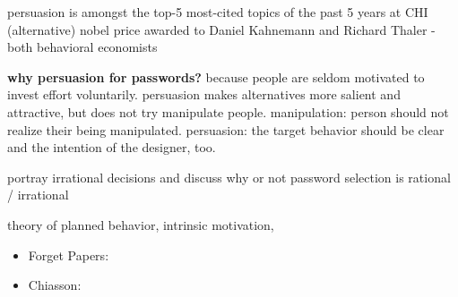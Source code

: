 	persuasion is amongst the top-5 most-cited topics of the past 5 years at CHI
	(alternative) nobel price awarded to Daniel Kahnemann and Richard Thaler - both behavioral economists
	
	\textbf{why persuasion for passwords?} because people are seldom motivated to invest effort voluntarily. persuasion makes alternatives more salient and attractive, but does not try manipulate people. manipulation: person should not realize their being manipulated. persuasion: the target behavior should be clear and the intention of the designer, too. 
	
	
	portray irrational decisions and discuss why or not password selection is rational / irrational
	
	theory of planned behavior, intrinsic motivation, 
	
	
	
	\begin{itemize}
		\item Forget Papers: \cite{Forget2007PersuasionEducationSecurity} \cite{Forget2007HelpingUsers} \cite{Forget2008ImprovingPasswordsThroughPersuasion} \cite{Forget2008MemorabilityPersuasivePasswords} \cite{Forget2008PersuasionStrongerPasswords}
		
		\item Chiasson: \cite{Chiasson2008PCCP}
	\end{itemize}
	
	
	\cite{Furnell2017GuidanceCompliance,Kaptein2015PersonalizingPersuasiveTechnologies,Gulenko2014PasswordsEmotion,Azevedo2012AuthenticationGame,Kroeze2012GamifyingAuthentication,Schneider2016UnderstandingPersuasiveDesign,Cialdini2003CraftingNormativeMessages,Scott1995GDMS,Kim2015MobilePersuasionTrust,Bellur2014HeuristicsUsed,Baharin2015RhythmicPersuasionModel,Adams2015MindlessComputing,Han1994PersuasionCulture,Balebako2011,Acquisti2009,Forget2007PersuasionEducationSecurity,Forget2008ImprovingPasswordsThroughPersuasion,Xu2007,Zakaria2013DesigningEffectiveSecurityMessages,Egelman2010PleaseContinueToHold,Yevseyeva2014,DiGioia2005SocialNavigationUsableSecurity,Chiasson2008PCCP,Wiafe2012,Weirich2005PersuasivePasswordSecurity,Forget2008MemorabilityPersuasivePasswords,Jeske2013,Wang2014,Weirich2001PrettyGoodPersuasion,Adjerid,Shiv2005,Wiafe2012a,Almuhimedi2015a,Radke2013,Arachchilage2013GameDesingPhishing,Ashenden2013SecurityLikeSoap,Bahr2013,Korff2014TooMuchChoice,Muscanell2014,Woodruff2014PrivacyFundamentalist,Korff2014,Goldstein2008,Forget2008PersuasionStrongerPasswords,Wang2013,Hamari2014,Jameson2011PreferentialChoice,Instructor2013,Mamduhi2012,Lockton2012CognitiveBiases,Choe,Fogg2002Persuasive,Fogg2009,Lockton2010,Hekler2013,Lockton2009,Lee2011MiningBehavioralEconomics}
	
